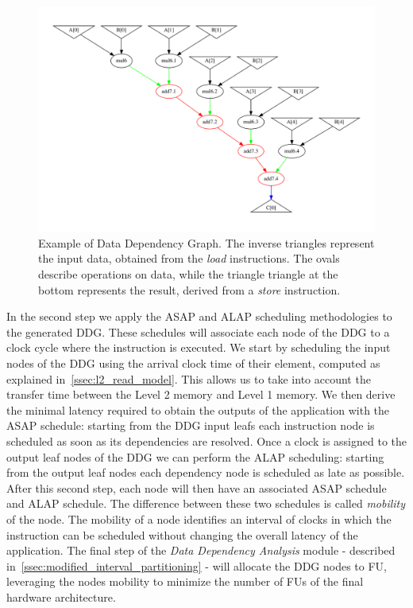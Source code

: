 \begin{figure}[tb] 
\centering
\includegraphics[width=.9\columnwidth,left]{images/supernode.pdf}
    \caption{\small Example of Data Dependency Graph. The inverse triangles represent the input data, obtained from the \textit{load} instructions. The ovals describe operations on data, while the triangle triangle at the bottom represents the result, derived from a \textit{store} instruction.}
\label{fig:ddg}
\end{figure}
In the second step we apply the ASAP and ALAP scheduling methodologies to the generated DDG. These schedules will associate each node of the DDG to a clock cycle where the instruction is executed. We start by scheduling the input nodes of the DDG using the arrival clock time of their element, computed as explained in~\ref{ssec:l2_read_model}. This allows us to take into account the transfer time between the Level 2 memory and Level 1 memory. We then derive the minimal latency required to obtain the outputs of the application with the ASAP schedule: starting from the DDG input leafs each instruction node is scheduled as soon as its dependencies are resolved. 
Once a clock is assigned to the output leaf nodes of the DDG we can perform the ALAP scheduling: starting from the output leaf nodes each dependency node is scheduled as late as possible. After this second step, each node will then have an associated ASAP schedule and ALAP schedule. The difference between these two schedules is called \textit{mobility} of the node. The mobility of a node identifies an interval of clocks in which the instruction can be scheduled without changing the overall latency of the application.
The final step of the \textit{Data Dependency Analysis} module - described in~\ref{ssec:modified_interval_partitioning} - will allocate the DDG nodes to FU, leveraging the nodes mobility to minimize the number of FUs of the final hardware architecture. 

